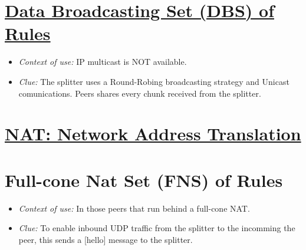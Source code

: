 \documentclass{article}
\begin{document}

\section{\href{http://www.p2psp.org/en/p2psp-protocol?cap=indexsu5.xht\#x12-100004.5}{Data Broadcasting Set (DBS) of Rules}}

\begin{itemize}
\item \emph{Context of use:} IP multicast is NOT available.
\item \emph{Clue:} The splitter uses a Round-Robing broadcasting
  strategy and Unicast comunications. Peers shares every chunk
  received from the splitter.
\end{itemize}

\ifx \HCode\Undfef
\else
{}
\fi


\section*{\href{https://en.wikipedia.org/wiki/Network_address_translation}{NAT: Network Address Translation}}

\ifx \HCode\Undfef
\else
{}
\fi


\section{Full-cone Nat Set (FNS) of Rules}

\begin{itemize}
\item \emph{Context of use:} In those peers that run behind a full-cone NAT.
\item \emph{Clue:} To enable inbound UDP traffic from the splitter to
  the incomming the peer, this sends a [hello] message to the splitter. 
\end{itemize}
\end{document}
